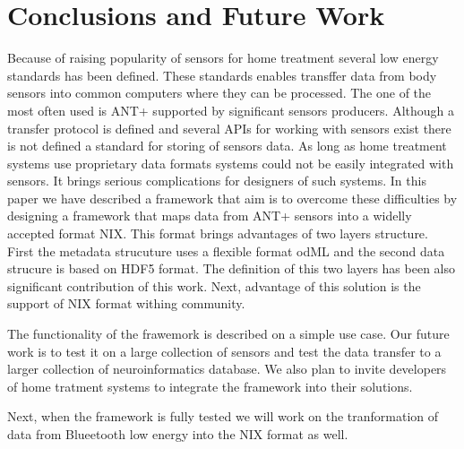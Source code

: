 \documentclass[conference]{IEEEconf}
\begin{document}
\section{Conclusions and Future Work}\label{sec:future-work}

Because of raising popularity of sensors for home treatment several low energy standards has been defined. These standards enables transffer data from body sensors into common computers where they can be processed. The one of the most often used is ANT+ supported by significant sensors producers. Although a transfer protocol is defined and several APIs for working with sensors exist there is not defined a standard for storing of sensors data. As long as home treatment systems use proprietary data formats systems could not be easily integrated with sensors. It brings serious complications for designers of such systems. In this paper we have described a framework that aim is to overcome these difficulties by designing a framework that maps data from ANT+ sensors into a widelly accepted format NIX. This format brings advantages of two layers structure. First the metadata strucuture uses a flexible format odML and the second data strucure is based on HDF5 format. The definition of this two layers has been also significant contribution of this work. Next, advantage of this solution is the support of NIX format withing community.

The functionality of the frawemork is described on a simple use case. Our future work is to test it on a large collection of sensors and test the data transfer to a larger collection of neuroinformatics database. We also plan to invite developers of home tratment systems to integrate the framework into their solutions. 

Next, when the framework is fully tested we will work on the tranformation of data from Blueetooth low energy into the NIX format as well. 






\end{document}
